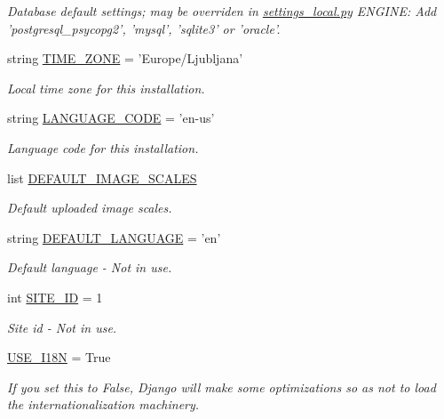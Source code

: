\begin{DoxyCompactItemize}
\begin{DoxyCompactList}\small\item\em Database default settings; may be overriden in \hyperlink{settings__local_8py}{settings\-\_\-local.\-py} E\-N\-G\-I\-N\-E\-: Add 'postgresql\-\_\-psycopg2', 'mysql', 'sqlite3' or 'oracle'. \end{DoxyCompactList}\item 
string \hyperlink{namespacewepo_1_1settings_abf6070aa707faad2afddfb65cc6884a7}{T\-I\-M\-E\-\_\-\-Z\-O\-N\-E} = 'Europe/Ljubljana'
\begin{DoxyCompactList}\small\item\em Local time zone for this installation. \end{DoxyCompactList}\item 
string \hyperlink{namespacewepo_1_1settings_a770ad9d20008a67ec0b4bdb522011c44}{L\-A\-N\-G\-U\-A\-G\-E\-\_\-\-C\-O\-D\-E} = 'en-\/us'
\begin{DoxyCompactList}\small\item\em Language code for this installation. \end{DoxyCompactList}\item 
list \hyperlink{namespacewepo_1_1settings_aad7d150719ceae447cdd1e7fbfd41731}{D\-E\-F\-A\-U\-L\-T\-\_\-\-I\-M\-A\-G\-E\-\_\-\-S\-C\-A\-L\-E\-S}
\begin{DoxyCompactList}\small\item\em Default uploaded image scales. \end{DoxyCompactList}\item 
string \hyperlink{namespacewepo_1_1settings_a536223da98afe60beb0a6ea3194889ce}{D\-E\-F\-A\-U\-L\-T\-\_\-\-L\-A\-N\-G\-U\-A\-G\-E} = 'en'
\begin{DoxyCompactList}\small\item\em Default language -\/ Not in use. \end{DoxyCompactList}\item 
int \hyperlink{namespacewepo_1_1settings_ab614d9076e4b5c83effad84ceb10f752}{S\-I\-T\-E\-\_\-\-I\-D} = 1
\begin{DoxyCompactList}\small\item\em Site id -\/ Not in use. \end{DoxyCompactList}\item 
\hyperlink{namespacewepo_1_1settings_a5f014d097a8a6dc725e7437b20342ef6}{U\-S\-E\-\_\-\-I18\-N} = True
\begin{DoxyCompactList}\small\item\em If you set this to False, Django will make some optimizations so as not to load the internationalization machinery. \end{DoxyCompactList}\item 

\end{DoxyCompactItemize}

